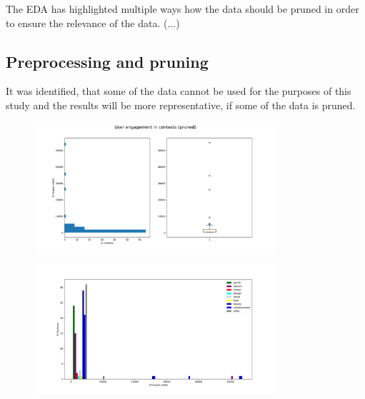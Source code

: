 The EDA has highlighted multiple ways how the data should be pruned in order to ensure the relevance of the data. (...)

\subsection{Preprocessing and pruning}
It was identified, that some of the data cannot be used for the purposes of this study and the results will be more representative, if some of the data is pruned. 

\begin{figure}[h] 
    \begin{center}
        \includegraphics[width=0.8\textwidth]{Images/user_engagement_in_contests-pruned.png}
        \caption{}
        \label{}
    \end{center}
\end{figure}

\begin{figure}[h] 
    \begin{center}
        \includegraphics[width=0.8\textwidth]{Images/user_engagement_in_categories_bar-pruned.png}
        \caption{}
        \label{}
    \end{center}
\end{figure}

